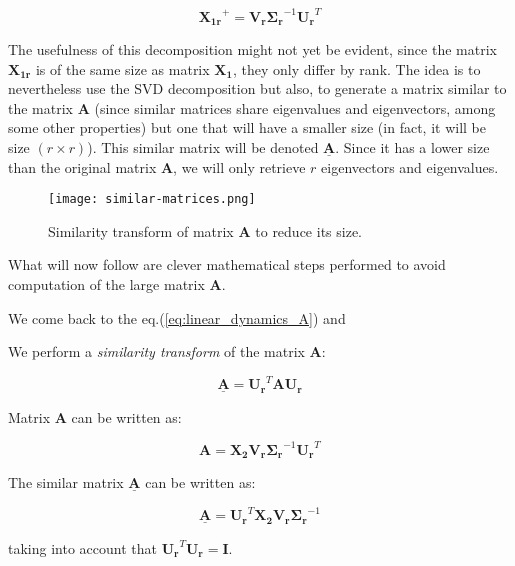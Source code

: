 \documentclass[10pt,twocolumn]{article}
\begin{document}
\begin{equation} \label{eq:pseudo-inverse}
\mathbf{X_{1r}}^{+} = \mathbf{V_r}  \mathbf{\Sigma_r}^{-1} \mathbf{U_r}^T
\end{equation}

The usefulness of this decomposition might not yet be evident, since the matrix $\mathbf{X_{1r}}$ is of the same size as matrix $\mathbf{X_{1}}$, they only differ by rank. The idea is to nevertheless use the SVD decomposition but also, to generate a matrix similar to the matrix $\mathbf{A}$ (since similar matrices share eigenvalues and eigenvectors, among some other properties) but one that will have a smaller size (in fact, it will be size $(r \times r)$). This similar matrix will be denoted $\underline{\mathbf{A}}$. Since it has a lower size than the original matrix $\mathbf{A}$, we will only retrieve $r$ eigenvectors and eigenvalues.

\begin{wrapfigure}{R}{0.25\textwidth}
\centering\texttt{[image: similar-matrices.png]}
\caption{Similarity transform of matrix $\mathbf{A}$ to reduce its size.}
\label{fig:similar-matrices}
\end{wrapfigure}

What will now follow are clever mathematical steps performed to avoid computation of the large matrix $\mathbf{A}$.

We come back to the eq.(\ref{eq:linear_dynamics_A}) and

We perform a \textit{similarity transform} of the matrix $\mathbf{A}$:

\begin{equation} \label{eq:similarity-transform}
\underline{\mathbf{A}} = \mathbf{U_r}^T \mathbf{A} \mathbf{U_r}
\end{equation}

Matrix $\mathbf{A}$ can be written as:

\begin{equation} \label{eq:A}
\mathbf{A} = \mathbf{X_2} \mathbf{V_r} \mathbf{\Sigma_r}^{-1} \mathbf{U_r}^T
\end{equation}

The similar matrix $\underline{\mathbf{A}}$ can be written as:

\begin{equation} \label{eq:A_underline}
\underline{\mathbf{A}} = \mathbf{U_r}^T \mathbf{X_2} \mathbf{V_r} \mathbf{\Sigma_r}^{-1} 
\end{equation}

taking into account that $\mathbf{U_r}^T \mathbf{U_r} = \mathbf{I}$.
\end{document}
